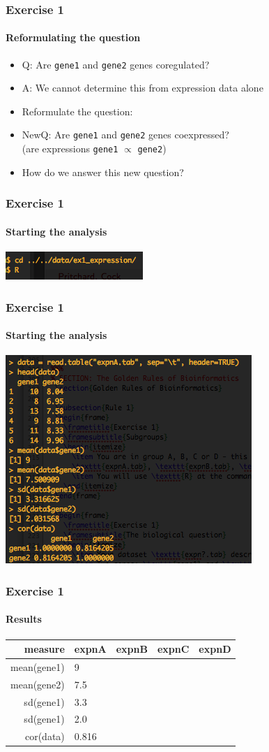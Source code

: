 \documentclass[table]{beamer}
\begin{document}
  \begin{frame}
    \frametitle{Exercise 1}
    \framesubtitle{Reformulating the question}
    \begin{itemize}
      \item Q: Are \texttt{gene1} and \texttt{gene2} genes coregulated?
      \item A: We cannot determine this from expression data alone
      \item Reformulate the question:
      \item NewQ: Are \texttt{gene1} and \texttt{gene2} genes coexpressed? \\
            (are expressions \texttt{gene1} $\propto$ \texttt{gene2})
      \item How do we answer this new question?
    \end{itemize}
  \end{frame}

  \begin{frame}
    \frametitle{Exercise 1}
    \framesubtitle{Starting the analysis}
    \includegraphics[width=.5\textwidth]{images/ex1_screenshot_a}
  \end{frame}

  \begin{frame}
    \frametitle{Exercise 1}
    \framesubtitle{Starting the analysis}
    \includegraphics[width=.5\textwidth]{images/ex1_screenshot_b}
  \end{frame}

  \begin{frame}
    \frametitle{Exercise 1}
    \framesubtitle{Results}
    \begin{center}
	\begin{tabular}{r|l|l|l|l}
	  measure & expnA & expnB & expnC & expnD \\
	  \hline
	  mean(gene1) & 9     &  &  & \\
	  mean(gene2) & 7.5   &  &  & \\
  	  sd(gene1)   & 3.3   &  &  & \\
  	  sd(gene1)   & 2.0   &  &  & \\  
	  cor(data)   & 0.816 &  &  & \\  
	\end{tabular}
	\end{center}
  \end{frame}
\end{document}
